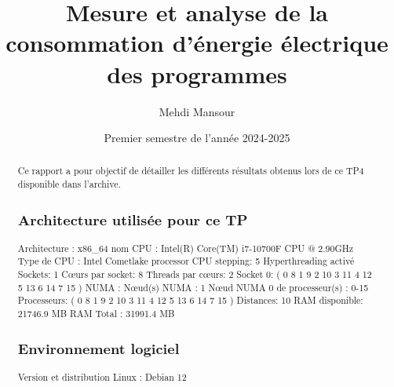 \documentclass{rapport}
\title{Mesure et analyse de la consommation d’énergie électrique des
programmes}
\author{Mehdi Mansour}
\date{Premier semestre de l'année 2024-2025}
\begin{document}
  \maketitle

  \begin{abstract}
    Ce rapport a pour objectif de détailler les différents résultats obtenus lors de ce TP4 disponible dans l'archive.
\subsection*{Architecture utilisée pour ce TP}
     \noindent
     Architecture : x86\_64
     \newline
      \noindent
     nom CPU :	Intel(R) Core(TM) i7-10700F CPU @ 2.90GHz
     \newline
     Type de CPU :	Intel Cometlake processor
     \newline
     CPU stepping:	5
     \newline
     Hyperthreading activé
     \newline
     Sockets:		1
     \newline
     Cœurs par socket:	8
     \newline
     Threads par cœurs:	2
     \newline
     Socket 0:		( 0 8 1 9 2 10 3 11 4 12 5 13 6 14 7 15 )
     \newline
     \newline
     NUMA :
     \newline \indent
         Nœud(s) NUMA : 1
          \newline \indent
         Nœud NUMA 0 de processeur(s) : 0-15
     \newline
     Processeurs:		( 0 8 1 9 2 10 3 11 4 12 5 13 6 14 7 15 )
     \newline
     Distances:		10
     \newline
     RAM disponible:		21746.9 MB
     \newline
     RAM Total :		31991.4 MB
 \subsection*{Environnement logiciel}
 Version et distribution Linux : Debian 12


\end{abstract}
\end{document}
